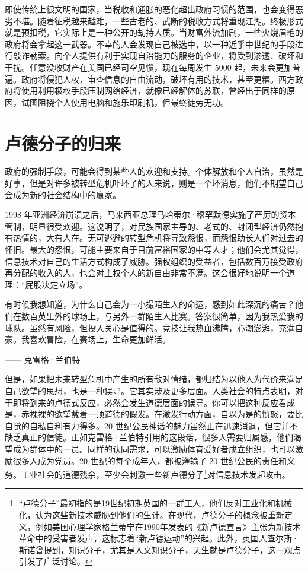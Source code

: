 即使传统上很文明的国家，当税收和通胀的恶化超出政府习惯的范围，也会变得恶劣不堪。随着征税越来越难，一些古老的、武断的税收方式将重现江湖。终极形式就是预扣税，它实际上是一种公开的劫持人质。当财富外流加剧，一些火烧眉毛的政府将会拿起这一武器。不幸的人会发现自己被选中，以一种近乎中世纪的手段进行敲诈勒索。向个人提供有利于实现自治能力的服务的企业，将受到渗透、破坏和干扰。任意没收财产在美国已经司空见惯，现在每周发生 5000 起，未来会更加普遍。政府将侵犯人权，审查信息的自由流动，破坏有用的技术，甚至更糟。西方政府将使用利用极权手段压制网络经济，就像已经解体的苏联，曾经出于同样的原因，试图阻挠个人使用电脑和施乐印刷机，但最终徒劳无功。



\section{卢德分子的归来}

政府的强制手段，可能会得到某些人的欢迎和支持。个体解放和个人自治，虽然是好事，但是对许多被转型危机吓坏了的人来说，则是一个坏消息，他们不期望自己会成为新的社会结构中的赢家。


1998 年亚洲经济崩溃之后，马来西亚总理马哈蒂尔·穆罕默德实施了严厉的资本管制，明显很受欢迎。这说明了，对民族国家主导的、老式的、封闭型经济仍然抱有热情的，大有人在。无可逃避的转型危机将导致怨恨，而怨恨助长人们对过去的怀旧。最大的怨恨，可能主要来自于目前富裕国家的中等人才；他们会尤其觉得，信息技术对自己的生活方式构成了威胁。强权组织的受益者，包括数百万接受政府再分配的收入的人，也会对主权个人的新自由非常不满。这会很好地说明一个道理：“屁股决定立场”。


\begin{tcolorbox}
\kaishu 有时候我想知道，为什么自己会为一小撮陌生人的命运，感到如此深沉的痛苦？他们在数百英里外的球场上，与另外一群陌生人比赛。答案很简单，因为我热爱我的球队。虽然有风险，但投入关心是值得的。竞技让我热血沸腾，心潮澎湃，充满自豪。我喜欢冒险，在赛场上，生命更加鲜活。
\begin{flushright}
—— 克雷格·兰伯特
\end{flushright}
\end{tcolorbox}

但是，如果把未来转型危机中产生的所有敌对情绪，都归结为以他人为代价来满足自己欲望的思想，也是一种误导。它其实涉及更多层面。人类社会的特点表明，对于即将到来的卢德式反应，必然会发生道德层面的误导。你可以把这种反应看成是，赤裸裸的欲望戴着一顶道德的假发。在激发行动方面，自以为是的愤怒，要比自觉的自私自利有力得多。20 世纪公民神话的魅力虽然正在迅速消退，但它并不缺乏真正的信徒。正如克雷格·兰伯特引用的这段话，很多人需要归属感，他们渴望成为群体中的一员。同样的认同需求，可以激励体育爱好者成立组织，也可以激励很多人成为党员。20 世纪的每个成年人，都被灌输了 20 世纪公民的责任和义务。工业社会的道德残余，至少会刺激一些新卢德分子\footnote{“卢德分子”最初指的是19世纪初期英国的一群工人，他们反对工业化和机械化，认为这些新技术威胁到他们的生计。在现代，卢德分子的概念被重新定义，例如美国心理学家格兰蒂宁在1990年发表的《新卢德宣言》主张为新技术革命中的受害者发声，这标志着“新卢德运动”的兴起。此外，英国人查尔斯·斯诺曾提到，知识分子，尤其是人文知识分子，天生就是卢德分子，这一观点引发了广泛讨论。}对信息技术发起攻击。


